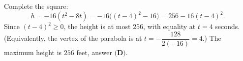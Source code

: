 Complete the square:
\[
h=-16(t^2-8t)=-16\big((t-4)^2-16\big)=256-16(t-4)^2 .
\]
Since $(t-4)^2\ge0$, the height is at most $256$, with equality at $t=4$ seconds. (Equivalently, the vertex of the parabola is at $t=-\dfrac{128}{2(-16)}=4$.) The maximum height is $256$ feet, answer $\boxed{\textbf{(D)}}$.
